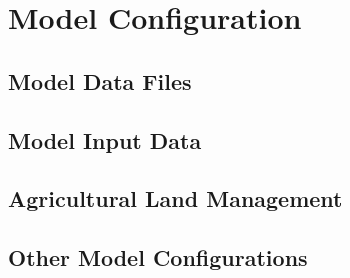 \section{Model Configuration}
	\subsection{Model Data Files}
		
	\subsection{Model Input Data}
		
		
		
		
		
		
		
	\pagebreak
	\subsection{Agricultural Land Management}\label{sec:ag_land_mgt}
		

%		
		
	\pagebreak
	\subsection{Other Model Configurations}
		
		
		
		
		
		
\pagebreak